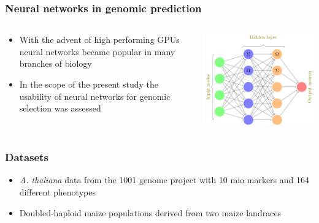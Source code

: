 \documentclass{beamer}
\begin{document}
\begin{frame}
   \frametitle{Neural networks in genomic prediction}
   \begin{columns}
     \begin{column}{0.5\textwidth}
       \begin{itemize}
       \item With the advent of high performing GPUs neural networks became popular in many branches of biology
         \item In the scope of the present study the usability of neural networks for genomic selection was assessed 
       \end{itemize}
     \end{column}
     \begin{column}{0.5\textwidth}
        \includegraphics[height=.6\textheight,width=.9\textwidth]{neuralnet}
     \end{column}
   \end{columns}
\end{frame}
 

\begin{frame}
  \frametitle{Datasets}
  \begin{itemize}[<+->]
  \item \textit{A. thaliana} data from the 1001 genome project with 10 mio markers and 164 different phenotypes
  \item Doubled-haploid maize populations derived from two maize landraces
  \end{itemize}
\end{frame}
\end{document}
